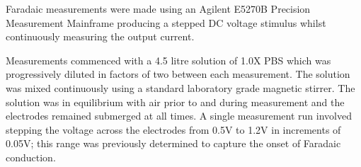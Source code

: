 \documentclass[journal, a4paper]{IEEEtran}
\begin{document}
Faradaic measurements were made using an Agilent E5270B Precision Measurement Mainframe producing a stepped DC voltage stimulus whilst continuously measuring the output current.

Measurements commenced with a 4.5 litre solution of 1.0X PBS which was progressively diluted in factors of two between each measurement. The solution was mixed continuously using a standard laboratory grade magnetic stirrer. The solution was in equilibrium with air prior to and during measurement and the electrodes remained submerged at all times.
A single measurement run involved stepping the voltage across the electrodes from 0.5\thinspace V to 1.2\thinspace V in increments of 0.05\thinspace V; this range was previously determined to capture the onset of Faradaic conduction.
\end{document}
